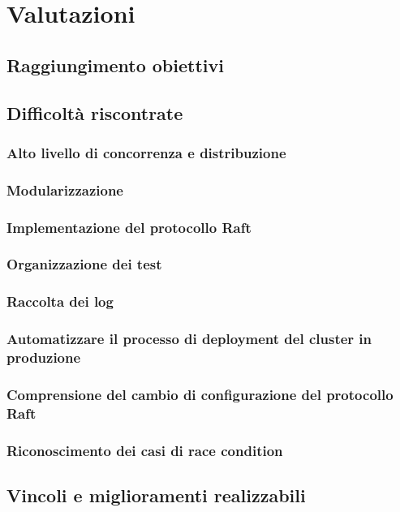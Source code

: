 
\section{Valutazioni}
\subsection{Raggiungimento obiettivi}

\subsection{Difficoltà riscontrate}
\subsubsection{Alto livello di concorrenza e distribuzione}

\subsubsection{Modularizzazione}

\subsubsection{Implementazione del protocollo Raft}

\subsubsection{Organizzazione dei test}

\subsubsection{Raccolta dei log}

\subsubsection{Automatizzare il processo di deployment del cluster in produzione}

\subsubsection{Comprensione del cambio di configurazione del protocollo Raft}

\subsubsection{Riconoscimento dei casi di race condition}

\subsection{Vincoli e miglioramenti realizzabili}
